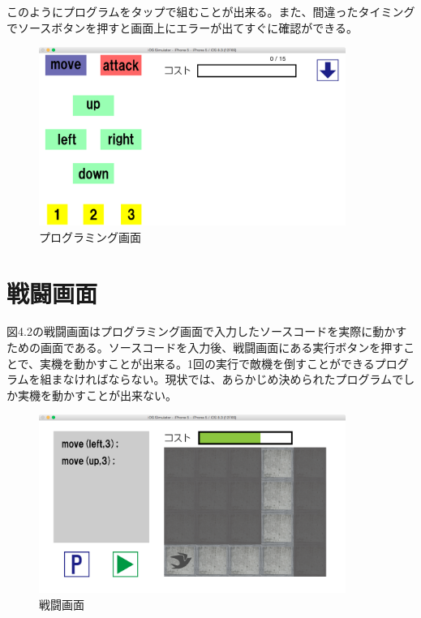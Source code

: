 \documentclass[openany,11pt,papersize]{jsbook}
\begin{document}
このようにプログラムをタップで組むことが出来る。また、間違ったタイミングでソースボタンを押すと画面上にエラーが出てすぐに確認ができる。

\begin{figure}[H]
\begin{center}
\includegraphics[width=10cm, bb=0 0 1136 662]{img/Prog-ra_programming.png}
\end{center}
\caption{プログラミング画面}
\end{figure}


\section{戦闘画面}
図4.2の戦闘画面はプログラミング画面で入力したソースコードを実際に動かすための画面である。ソースコードを入力後、戦闘画面にある実行ボタンを押すことで、実機を動かすことが出来る。1回の実行で敵機を倒すことができるプログラムを組まなければならない。現状では、あらかじめ決められたプログラムでしか実機を動かすことが出来ない。

\begin{figure}[h]
\begin{center}
\includegraphics[width=10cm, bb=0 0 1136 662]{img/Prog-ra_Battle.png}
\end{center}
\caption{戦闘画面}
\end{figure}
\end{document}
